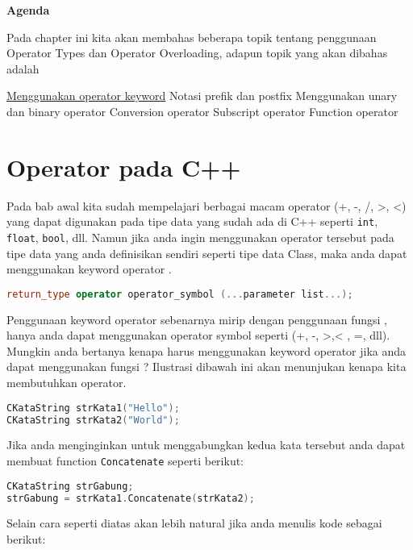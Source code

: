 \textbf{Agenda}

Pada chapter ini kita akan membahas beberapa topik tentang penggunaan
Operator Types dan Operator Overloading, adapun topik yang akan dibahas
adalah

\begin{outline}
\1
  \protect\hyperlink{operator-pada-cpp}{Menggunakan operator keyword}
\1
  Notasi prefik dan postfix
\1
  Menggunakan unary dan binary operator
\1
  Conversion operator
\1
  Subscript operator
\1
  Function operator
\end{outline}

\section{Operator pada C++}\label{operator-pada-cpp}

Pada bab awal kita sudah mempelajari berbagai macam operator (+, -, /,
\textgreater{}, \textless{}) yang dapat digunakan pada tipe data yang
sudah ada di C++ seperti \texttt{int}, \texttt{float}, \texttt{bool},
dll. Namun jika anda ingin menggunakan operator tersebut pada tipe data
yang anda definisikan sendiri seperti tipe data Class, maka anda dapat
menggunakan keyword operator .

\begin{lstlisting}[language=c++, numbers=none]
return_type operator operator_symbol (...parameter list...);
\end{lstlisting}

Penggunaan keyword operator sebenarnya mirip dengan penggunaan fungsi ,
hanya anda dapat menggunakan operator symbol seperti (+, -,
\textgreater{},\textless{} , =, dll). Mungkin anda bertanya kenapa harus
menggunakan keyword operator jika anda dapat menggunakan fungsi ?
Ilustrasi dibawah ini akan menunjukan kenapa kita membutuhkan operator.

\begin{lstlisting}[language=c++, numbers=none]
CKataString strKata1("Hello");
CKataString strKata2("World");
\end{lstlisting}

Jika anda menginginkan untuk menggabungkan kedua kata tersebut anda
dapat membuat function \texttt{Concatenate} seperti berikut:

\begin{lstlisting}[language=c++, numbers=none]
CKataString strGabung;
strGabung = strKata1.Concatenate(strKata2);
\end{lstlisting}

Selain cara seperti diatas akan lebih natural jika anda menulis kode
sebagai berikut:

